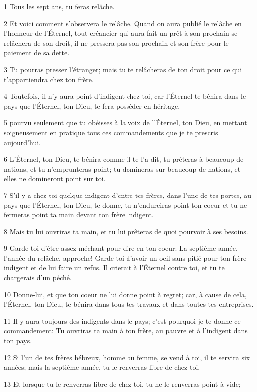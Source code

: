 \par 1 Tous les sept ans, tu feras relâche.
\par 2 Et voici comment s'observera le relâche. Quand on aura publié le relâche en l'honneur de l'Éternel, tout créancier qui aura fait un prêt à son prochain se relâchera de son droit, il ne pressera pas son prochain et son frère pour le paiement de sa dette.
\par 3 Tu pourras presser l'étranger; mais tu te relâcheras de ton droit pour ce qui t'appartiendra chez ton frère.
\par 4 Toutefois, il n'y aura point d'indigent chez toi, car l'Éternel te bénira dans le pays que l'Éternel, ton Dieu, te fera posséder en héritage,
\par 5 pourvu seulement que tu obéisses à la voix de l'Éternel, ton Dieu, en mettant soigneusement en pratique tous ces commandements que je te prescris aujourd'hui.
\par 6 L'Éternel, ton Dieu, te bénira comme il te l'a dit, tu prêteras à beaucoup de nations, et tu n'emprunteras point; tu domineras sur beaucoup de nations, et elles ne domineront point sur toi.
\par 7 S'il y a chez toi quelque indigent d'entre tes frères, dans l'une de tes portes, au pays que l'Éternel, ton Dieu, te donne, tu n'endurciras point ton coeur et tu ne fermeras point ta main devant ton frère indigent.
\par 8 Mais tu lui ouvriras ta main, et tu lui prêteras de quoi pourvoir à ses besoins.
\par 9 Garde-toi d'être assez méchant pour dire en ton coeur: La septième année, l'année du relâche, approche! Garde-toi d'avoir un oeil sans pitié pour ton frère indigent et de lui faire un refus. Il crierait à l'Éternel contre toi, et tu te chargerais d'un péché.
\par 10 Donne-lui, et que ton coeur ne lui donne point à regret; car, à cause de cela, l'Éternel, ton Dieu, te bénira dans tous tes travaux et dans toutes tes entreprises.
\par 11 Il y aura toujours des indigents dans le pays; c'est pourquoi je te donne ce commandement: Tu ouvriras ta main à ton frère, au pauvre et à l'indigent dans ton pays.
\par 12 Si l'un de tes frères hébreux, homme ou femme, se vend à toi, il te servira six années; mais la septième année, tu le renverras libre de chez toi.
\par 13 Et lorsque tu le renverras libre de chez toi, tu ne le renverras point à vide;
